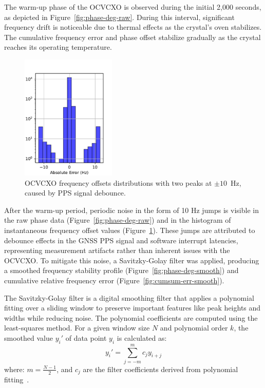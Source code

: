 \documentclass[12pt, a4paper]{extarticle}
\begin{document}
The warm-up phase of the OCVCXO is observed during the initial 2,000 seconds,
as depicted in Figure~\ref{fig:phase-deg-raw}. During this interval,
significant frequency drift is noticeable due to thermal effects as the
crystal's oven stabilizes. The cumulative frequency error and phase offset
stabilize gradually as the crystal reaches its operating temperature.

\begin{figure}
    \centering
    \includegraphics[width=0.4\textwidth]{err-bins.pdf}
    \captionsetup{width=0.4\textwidth}
    \caption{OCVCXO frequency offsets distributions with two peaks at $\pm 10$~Hz, caused by PPS signal debounce.}
    \label{fig:err-bins}
\end{figure}

After the warm-up period, periodic noise in the form of 10 Hz jumps is visible
in the raw phase data (Figure~\ref{fig:phase-deg-raw}) and in the histogram of
instantaneous frequency offset values (Figure~\ref{fig:err-bins}). These jumps
are attributed to debounce effects in the GNSS PPS signal and software
interrupt latencies, representing measurement artifacts rather than inherent
issues with the OCVCXO. To mitigate this noise, a Savitzky-Golay filter was
applied, producing a smoothed frequency stability profile
(Figure~\ref{fig:phase-deg-smooth}) and cumulative relative frequency error
(Figure~\ref{fig:cumsum-err-smooth}).

The Savitzky-Golay filter is a digital smoothing filter that applies a
polynomial fitting over a sliding window to preserve important features like
peak heights and widths while reducing noise. The polynomial coefficients are
computed using the least-squares method. For a given window size \( N \) and
polynomial order \( k \), the smoothed value \( y_i' \) of data point \( y_i \)
is calculated as:
\[
y_i' = \sum_{j=-m}^{m} c_j y_{i+j}
\]
where:
\( m = \frac{N-1}{2} \), and
\( c_j \) are the filter coefficients derived from polynomial fitting~\cite{sg-filter}.
\end{document}
